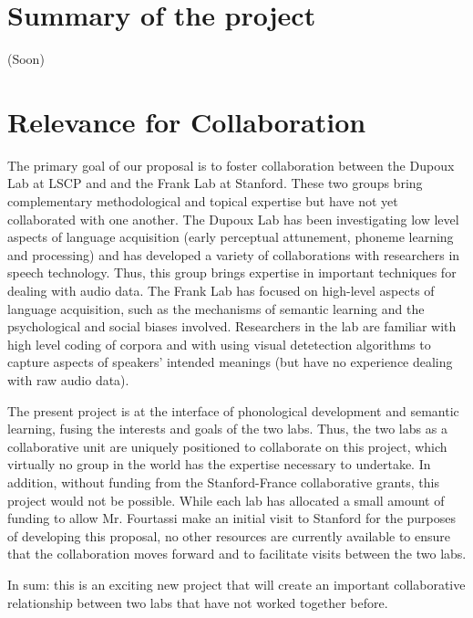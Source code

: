 \documentclass[12pt]{article}
\begin{document}
\section*{Summary of the project}
(Soon) 

\newpage

\section*{Relevance for Collaboration}

The primary goal of our proposal is to foster collaboration between the Dupoux Lab at LSCP and and the Frank Lab at Stanford. These two groups bring complementary methodological and topical expertise but have not yet collaborated with one another. The Dupoux Lab has been investigating low level aspects of language acquisition (early perceptual attunement, phoneme learning and processing) and has developed a variety of collaborations with researchers in speech technology. Thus, this group brings expertise in important techniques for dealing with audio data. The Frank Lab has focused on high-level aspects of language acquisition, such as the mechanisms of semantic learning and the psychological and social biases involved. Researchers in the lab are familiar with high level coding of corpora and with using visual detetection algorithms to capture aspects of speakers' intended meanings (but have no experience dealing with raw audio data).

The present project is at the interface of phonological development and semantic learning, fusing the interests and goals of the two labs. Thus, the two labs as a collaborative unit are uniquely positioned to collaborate on this project, which virtually no group in the world has the expertise necessary to undertake. In addition, without funding from the Stanford-France collaborative grants, this project would not be possible. While each lab has allocated a small amount of funding to allow Mr. Fourtassi make an initial visit to Stanford for the purposes of developing this proposal, no other resources are currently available to ensure that the collaboration moves forward and to facilitate visits between the two labs. 

In sum: this is an exciting new project that will create an important collaborative relationship between two labs that have not worked together before.
\end{document}
